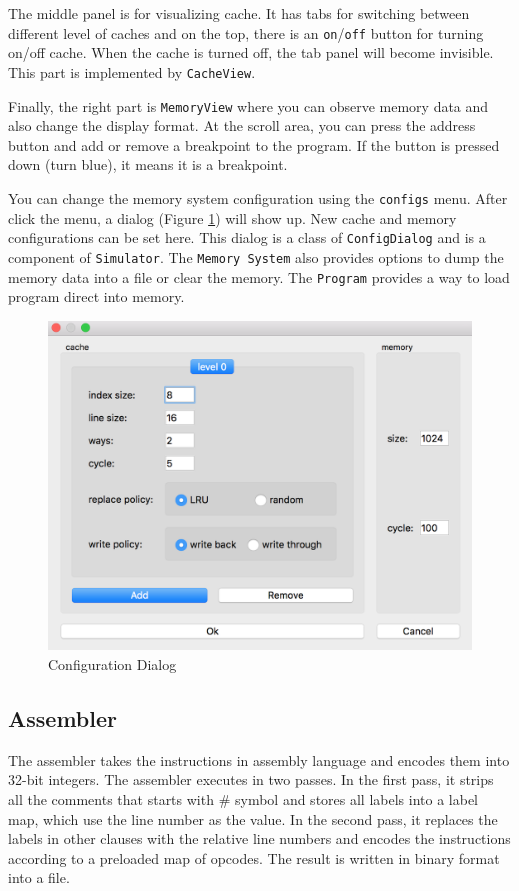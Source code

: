 \documentclass{sig-alternate}
\begin{document}
The middle panel is for visualizing cache. It has tabs for switching between different level of caches and on the top, there is an \texttt{on}/\texttt{off} button for turning on/off cache. When the cache is turned off, the tab panel will become invisible. This part is implemented by \texttt{CacheView}. 

Finally, the right part is \texttt{MemoryView} where you can observe memory data and also change the display format. At the scroll area, you can press the address button and add or remove a breakpoint to the program. If the button is pressed down (turn blue), it means it is a breakpoint. 

You can change the memory system configuration using the \texttt{configs} menu. After click the menu, a dialog (Figure \ref{fig:conf}) will show up. New cache and memory configurations can be set here. This dialog is a class of \texttt{ConfigDialog} and is a component of \texttt{Simulator}. The \texttt{Memory System} also provides options to dump the memory data into a file or clear the memory. The \texttt{Program} provides a way to load program direct into memory. 
\begin{figure}[!ht]
\centering
\includegraphics[width = 0.8\linewidth,keepaspectratio]{config}
\caption{Configuration Dialog}
\label{fig:conf}
\end{figure}

\subsection{Assembler }
The assembler takes the instructions in assembly language and encodes them into 32-bit integers. The assembler executes in two passes. In the first pass, it strips all the comments that starts with $\#$ symbol and stores all labels into a label map, which use the line number as the value. In the second pass, it replaces the labels in other clauses with the relative line numbers and encodes the instructions according to a preloaded map of opcodes. The result is written in binary format into a file. 
\end{document}
